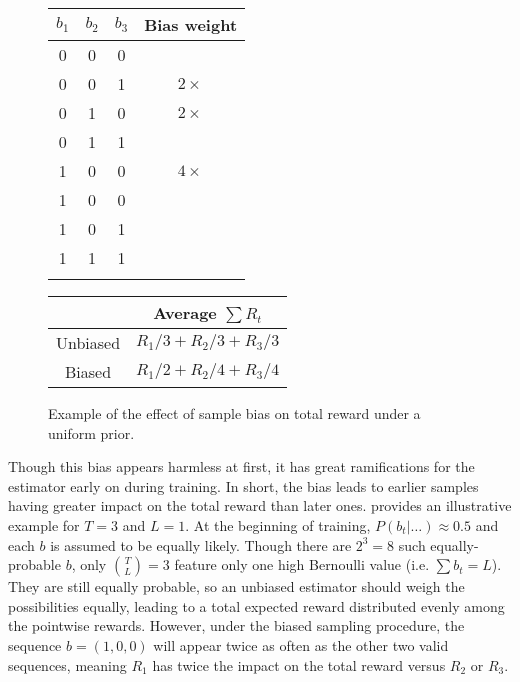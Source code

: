 \documentclass{article}
\begin{document}
\begin{figure}
    \centering
    \begin{minipage}{.45\textwidth}
        \begin{tabular}{c c c | c}
            $b_1$ & $b_2$ & $b_3$ & Bias weight \\
            \hline
            0 & 0 & 0 & \\[-1.5ex]
            \hline\noalign{\vspace{\dimexpr 1.5ex-\doublerulesep}}
            0 & 0 & 1 & $2 \times$ \\
            0 & 1 & 0 & $2 \times$ \\
            0 & 1 & 1 & \\[-1.5ex]
            \hline\noalign{\vspace{\dimexpr 1.5ex-\doublerulesep}}
            1 & 0 & 0 & $4 \times$ \\
            1 & 0 & 0 & \\[-1.5ex]
            \hline\noalign{\vspace{\dimexpr 1.5ex-\doublerulesep}}
            1 & 0 & 1 & \\[-1.5ex]
            \hline\noalign{\vspace{\dimexpr 1.5ex-\doublerulesep}}
            1 & 1 & 1 & \\[-1.5ex]
            \hline\noalign{\vspace{\dimexpr 1.5ex-\doublerulesep}}
        \end{tabular}
    \end{minipage}
    \begin{minipage}{.45\textwidth}
        \begin{tabular}{c | c}
                        & Average $\sum R_t$ \\
            \hline
            Unbiased    & $R_1 / 3 + R_2 / 3 + R_3 / 3$ \\
            Biased      & $R_1 / 2 + R_2 / 4 + R_3 / 4$
        \end{tabular}
    \end{minipage}
    \caption{
        Example of the effect of sample bias on total reward under a uniform
        prior.}
    \label{fig:bias}
\end{figure}

Though this bias appears harmless at first, it has great ramifications for the
estimator early on during training. In short, the bias leads to earlier samples
having greater impact on the total reward than later ones. 
provides an illustrative example for $T = 3$ and $L = 1$. At the beginning of
training, $P(b_t|\ldots) \approx 0.5$ and each $b$ is assumed to be equally
likely. Though there are $2^3 = 8$ such equally-probable $b$, only
$\binom{T}{L} = 3$ feature only one high Bernoulli value (i.e. $\sum b_t = L$).
They are still equally probable, so an unbiased estimator should weigh the
possibilities equally, leading to a total expected reward distributed evenly
among the pointwise rewards. However, under the biased sampling procedure, the
sequence $b = (1, 0, 0)$ will appear twice as often as the other two valid
sequences, meaning $R_1$ has twice the impact on the total reward versus $R_2$
or $R_3$.
\end{document}
